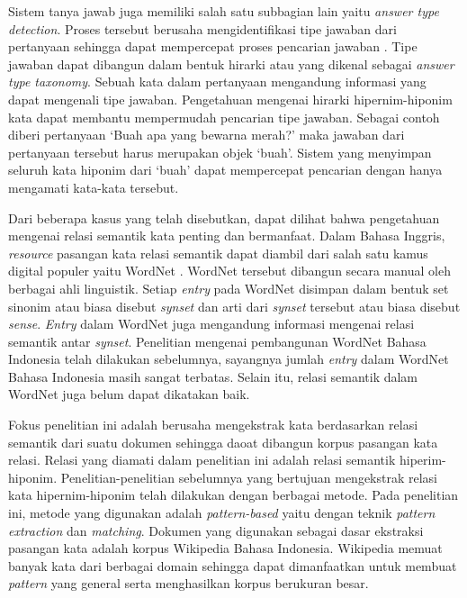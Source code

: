 Sistem tanya jawab juga memiliki salah satu subbagian lain yaitu \textit{answer type detection}. Proses tersebut berusaha mengidentifikasi tipe jawaban dari pertanyaan sehingga dapat mempercepat proses pencarian jawaban \citep{jurafsky2000speech}. Tipe jawaban dapat dibangun dalam bentuk hirarki atau yang dikenal sebagai \textit{answer type taxonomy}. Sebuah kata dalam pertanyaan mengandung informasi yang dapat mengenali tipe jawaban. Pengetahuan mengenai hirarki hipernim-hiponim kata dapat membantu mempermudah pencarian tipe jawaban. Sebagai contoh diberi pertanyaan `Buah apa yang bewarna merah?' maka jawaban dari pertanyaan tersebut harus merupakan objek `buah'. Sistem yang menyimpan seluruh kata hiponim dari `buah' dapat mempercepat pencarian dengan hanya mengamati kata-kata tersebut.

Dari beberapa kasus yang telah disebutkan, dapat dilihat bahwa pengetahuan mengenai relasi semantik kata penting dan bermanfaat. Dalam Bahasa Inggris, \textit{resource} pasangan kata relasi semantik dapat diambil dari salah satu kamus digital populer yaitu WordNet \citep{miller1995wordnet}. WordNet tersebut dibangun secara manual oleh berbagai ahli linguistik. Setiap \textit{entry} pada WordNet disimpan dalam bentuk set sinonim atau biasa disebut \textit{synset} dan arti dari \textit{synset} tersebut atau biasa disebut \textit{sense}. \textit{Entry} dalam WordNet juga mengandung informasi mengenai relasi semantik antar \textit{synset}. Penelitian mengenai pembangunan WordNet Bahasa Indonesia telah dilakukan sebelumnya, sayangnya jumlah \textit{entry} dalam WordNet Bahasa Indonesia masih sangat terbatas. Selain itu, relasi semantik dalam WordNet juga belum dapat dikatakan baik.

Fokus penelitian ini adalah berusaha mengekstrak kata berdasarkan relasi semantik dari suatu dokumen sehingga daoat dibangun korpus pasangan kata relasi. Relasi yang diamati dalam penelitian ini adalah relasi semantik hiperim-hiponim. Penelitian-penelitian sebelumnya yang bertujuan mengekstrak relasi kata hipernim-hiponim telah dilakukan dengan berbagai metode. Pada penelitian ini, metode yang digunakan adalah \textit{pattern-based} yaitu dengan teknik \textit{pattern extraction} dan \textit{matching}. Dokumen yang digunakan sebagai dasar ekstraksi pasangan kata adalah korpus Wikipedia Bahasa Indonesia. Wikipedia memuat banyak kata dari berbagai domain sehingga dapat dimanfaatkan untuk membuat \textit{pattern} yang general serta menghasilkan korpus berukuran besar.


